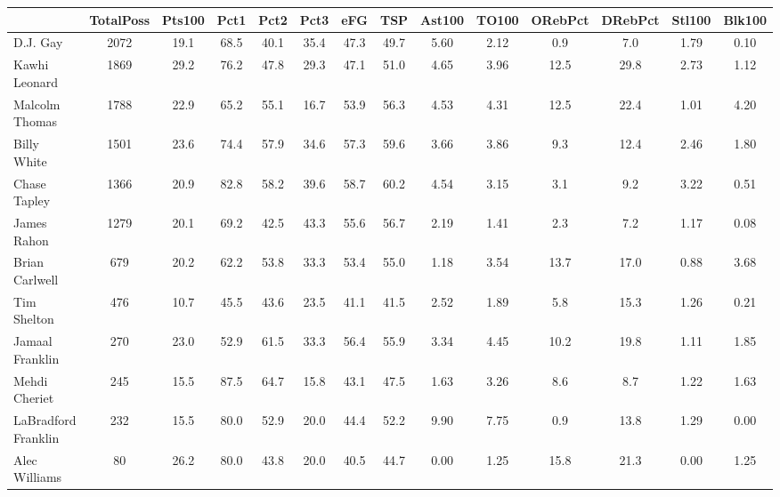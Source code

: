 \documentclass[10pt,letterpaper]{article}
\begin{document}
\begin{table}[ht]
\begin{center}
\begin{tabular}{lccccccccccccc}
  \hline
 & TotalPoss & Pts100 & Pct1 & Pct2 & Pct3 & eFG & TSP & Ast100 & TO100 & ORebPct & DRebPct & Stl100 & Blk100 \\ 
  \hline
D.J. Gay & 2072 & 19.1 & 68.5 & 40.1 & 35.4 & 47.3 & 49.7 & 5.60 & 2.12 & 0.9 & 7.0 & 1.79 & 0.10 \\ 
  Kawhi Leonard & 1869 & 29.2 & 76.2 & 47.8 & 29.3 & 47.1 & 51.0 & 4.65 & 3.96 & 12.5 & 29.8 & 2.73 & 1.12 \\ 
  Malcolm Thomas & 1788 & 22.9 & 65.2 & 55.1 & 16.7 & 53.9 & 56.3 & 4.53 & 4.31 & 12.5 & 22.4 & 1.01 & 4.20 \\ 
  Billy White & 1501 & 23.6 & 74.4 & 57.9 & 34.6 & 57.3 & 59.6 & 3.66 & 3.86 & 9.3 & 12.4 & 2.46 & 1.80 \\ 
  Chase Tapley & 1366 & 20.9 & 82.8 & 58.2 & 39.6 & 58.7 & 60.2 & 4.54 & 3.15 & 3.1 & 9.2 & 3.22 & 0.51 \\ 
  James Rahon & 1279 & 20.1 & 69.2 & 42.5 & 43.3 & 55.6 & 56.7 & 2.19 & 1.41 & 2.3 & 7.2 & 1.17 & 0.08 \\ 
  Brian Carlwell & 679 & 20.2 & 62.2 & 53.8 & 33.3 & 53.4 & 55.0 & 1.18 & 3.54 & 13.7 & 17.0 & 0.88 & 3.68 \\ 
  Tim Shelton & 476 & 10.7 & 45.5 & 43.6 & 23.5 & 41.1 & 41.5 & 2.52 & 1.89 & 5.8 & 15.3 & 1.26 & 0.21 \\ 
  Jamaal Franklin & 270 & 23.0 & 52.9 & 61.5 & 33.3 & 56.4 & 55.9 & 3.34 & 4.45 & 10.2 & 19.8 & 1.11 & 1.85 \\ 
  Mehdi Cheriet & 245 & 15.5 & 87.5 & 64.7 & 15.8 & 43.1 & 47.5 & 1.63 & 3.26 & 8.6 & 8.7 & 1.22 & 1.63 \\ 
  LaBradford Franklin & 232 & 15.5 & 80.0 & 52.9 & 20.0 & 44.4 & 52.2 & 9.90 & 7.75 & 0.9 & 13.8 & 1.29 & 0.00 \\ 
  Alec Williams & 80 & 26.2 & 80.0 & 43.8 & 20.0 & 40.5 & 44.7 & 0.00 & 1.25 & 15.8 & 21.3 & 0.00 & 1.25 \\ 
   \hline
\end{tabular}
\end{center}
\end{table}
\end{document}
